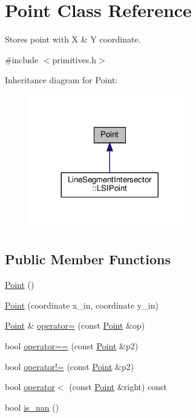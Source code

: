 \hypertarget{classPoint}{}\section{Point Class Reference}
\label{classPoint}


Stores point with X \& Y coordinate.  




{\ttfamily \#include $<$primitives.\+h$>$}



Inheritance diagram for Point\+:
\nopagebreak
\begin{figure}[H]
\begin{center}
\leavevmode
\includegraphics[width=200pt]{classPoint__inherit__graph}
\end{center}
\end{figure}
\subsection*{Public Member Functions}
\begin{DoxyCompactItemize}
\item 
\hyperlink{classPoint_ad92f2337b839a94ce97dcdb439b4325a}{Point} ()
\item 
\hyperlink{classPoint_af7373698b9fafc53b0a5d06e511642e1}{Point} (coordinate x\+\_\+in, coordinate y\+\_\+in)
\item 
\hyperlink{classPoint}{Point} \& \hyperlink{classPoint_a2e142edc132377fdc6873f6549daab2d}{operator=} (const \hyperlink{classPoint}{Point} \&op)
\item 
bool \hyperlink{classPoint_ac7bc64b9a683d5fb35780c739779f2fc}{operator==} (const \hyperlink{classPoint}{Point} \&p2)
\item 
bool \hyperlink{classPoint_ade5f3908ec0e412aea8c3e12f5d0e26f}{operator!=} (const \hyperlink{classPoint}{Point} \&p2)
\item 
bool \hyperlink{classPoint_a2d285a505e84d64a96974d5247e8ae7a}{operator$<$} (const \hyperlink{classPoint}{Point} \&right) const
\item 
bool \hyperlink{classPoint_a2bc8aed929f6be2b543ba2f26b8a5f72}{is\+\_\+nan} ()
\end{DoxyCompactItemize}
